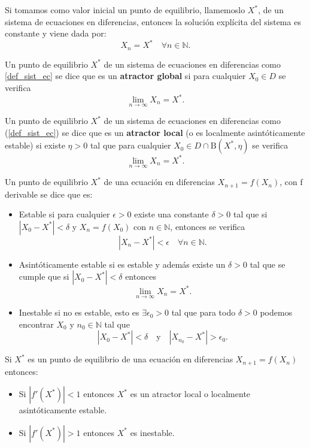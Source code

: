 \begin{proposition}
Si tomamos como valor inicial un punto de equilibrio, llamemoslo $X^*$, de un sistema de ecuaciones en diferencias, entonces la solución explícita del sistema es constante y viene dada por:
$$X_n = X^* \quad \forall n\in\mathbb{N}.$$
\end{proposition}

\begin{definition}
Un punto de equilibrio $X^*$ de un sistema de ecuaciones en diferencias como \eqref{def_sist_ec} se dice que es un \textbf{atractor global} si para cualquier $X_0\in D$ se verifica
$$\displaystyle\lim_{n\to \infty} X_n = X^*.$$
\end{definition}

\begin{definition}
Un punto de equilibrio $X^*$ de un sistema de ecuaciones en diferencias como (\ref{def_sist_ec}) se dice que es un \textbf{atractor local} (o es localmente asintóticamente estable) si existe $\eta>0$ tal que para cualquier $X_0\in D\cap \text{B}(X^*, \eta )$ se verifica
$$\displaystyle\lim_{n\to \infty} X_n = X^*.$$

\end{definition}

\begin{definition}
Un punto de equilibrio $X^*$ de una ecuación en diferencias $X_{n+1}=f(X_n)$, con f derivable se dice que es:
\begin{itemize}
\item Estable si para cualquier $\epsilon > 0$ existe una constante $\delta > 0$ tal que si $|X_0-X^*|<\delta$ y $X_n=f(X_0)$ con $n\in\mathbb{N}$, entonces se verifica
$$|X_n-X^*| < \epsilon \quad \forall n \in\mathbb{N}.$$
\item Asintóticamente estable si es estable y además existe un $\delta > 0$ tal que se cumple que  si $|X_0-X^*|<\delta$ entonces
$$\lim_{n\rightarrow\infty} X_n = X^*.$$
\item Inestable si no es estable, esto es $\exists \epsilon_0 >0$ tal que para todo $\delta >0$ podemos encontrar $X_0$ y $n_0\in\mathbb{N}$ tal que
$$|X_0-X^*|<\delta \quad \text{y} \quad |X_{n_0}-X^*|>\epsilon_0.$$
\end{itemize}
\end{definition}

\begin{proposition}
Si $X^*$ es un punto de equilibrio de una ecuación en diferencias $X_{n+1}=f(X_n)$ entonces:
\begin{itemize}
\item Si $|f'(X^*)|<1$ entonces $X^*$ es un atractor local o localmente asintóticamente estable.
\item Si $|f'(X^*)|>1$ entonces $X^*$ es inestable.
\end{itemize}
\end{proposition}

